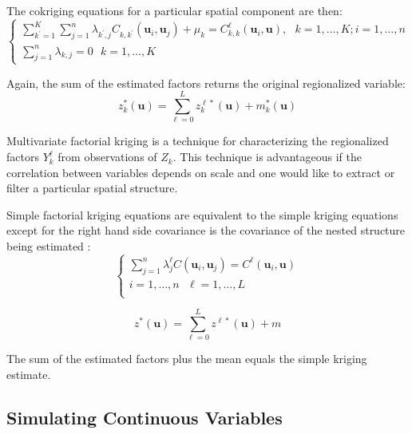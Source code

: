 The cokriging equations for a particular spatial component are then:
\begin{equation*}
    \begin{cases}
        \sum_{k^{\prime}=1}^{K} \sum_{j=1}^{n} \lambda_{k^{\prime},j} C_{k,k^{\prime}}(\mathbf{u}_{i}, \mathbf{u}_{j}) + \mu_{k} = C_{k,k}^{\ell}(\mathbf{u}_{i},\mathbf{u}), \ \ \ k=1,\dots,K; i=1,\dots,n \\
        \sum_{j=1}^{n} \lambda_{k,j} = 0  \ \ \ k=1,\dots,K
    \end{cases}
\end{equation*}

Again, the sum of the estimated factors returns the original regionalized variable:
\begin{equation*}
    z^{*}_{k}(\mathbf{u}) = \sum_{\ell=0}^{L} z^{\ell*}_{k}(\mathbf{u}) + m^{*}_{k}(\mathbf{u})
\end{equation*}

Multivariate factorial kriging is a technique for characterizing the regionalized factors $Y_{k}^{\ell}$ from observations of $Z_{k}$. This technique is advantageous if the correlation between variables depends on scale and one would like to extract or filter a particular spatial structure.

Simple factorial kriging equations are equivalent to the simple kriging equations except for the right hand side covariance is the covariance of the nested structure being estimated \citep{hong2007improved}:
\begin{equation*}
    \begin{cases}
        \sum_{j=1}^{n} \lambda_{j}^{\ell} C(\mathbf{u}_{i}, \mathbf{u}_{j}) = C^{\ell}(\mathbf{u}_{i}, \mathbf{u}) \\
        i=1,\dots,n \ \ \ \ell=1,\dots,L                                                                           \\
    \end{cases}
\end{equation*}

\begin{equation*}
    z^{*}(\mathbf{u}) = \sum_{\ell=0}^{L} z^{\ell*}(\mathbf{u}) + m
\end{equation*}

The sum of the estimated factors plus the mean equals the simple kriging estimate.

\subsection{Simulating Continuous Variables}
\label{subsec:01simulate}

